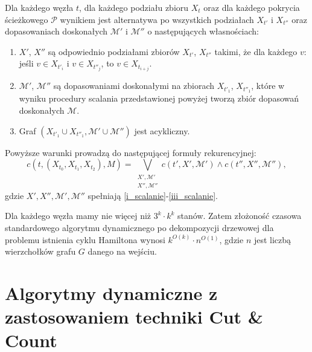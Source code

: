 \documentclass[12pt, oneside]{report}
\newcommand\Omicron{O}
\begin{document}
Dla każdego węzła $t$, dla każdego podziału zbioru $X_t$ oraz dla każdego pokrycia ścieżkowego $\mathcal{P}$ wynikiem jest alternatywa po wszystkich podziałach $X_{t'}$ i $X_{t''}$ oraz dopasowaniach doskonałych $\mathcal{M}'$ i $\mathcal{M}''$ o następujących własnościach:
\begin{enumerate}[label=(\roman*)]
\item \label{i_scalanie}$X'$, $X''$ są odpowiednio podziałami zbiorów $X_{t'}$, $X_{t''}$ takimi, że dla każdego $v$: jeśli $v \in X_{t'_i}$ i $v \in X_{t''_j}$, to $v \in X_{t_{i+j}}$.
\item $\mathcal{M}'$, $\mathcal{M}''$ są dopasowaniami doskonałymi na zbiorach $X_{t'_1}$, $X_{t''_1}$, które w wyniku procedury scalania przedstawionej powyżej 
tworzą zbiór dopasowań doskonałych $\mathcal{M}$.
\item \label{iii_scalanie}Graf $(X_{t'_1} \cup X_{t''_1}, \mathcal{M}' \cup \mathcal{M}'')$ jest acykliczny.
\end{enumerate}
Powyższe warunki prowadzą do następującej formuły rekurencyjnej:
$$c(t, (X_{t_0}, X_{t_1}, X_{t_2}), M) = \bigvee \limits_{\substack{X', \mathcal{M}'\\X'',\mathcal{M}''}} c(t', X', \mathcal{M}') \wedge c(t'', X'', \mathcal{M}''),$$ gdzie $X', X'', \mathcal{M}', \mathcal{M}''$ spełniają \ref{i_scalanie}-\ref{iii_scalanie}.

Dla każdego węzła mamy nie więcej niż $3^k \cdot k^k$ stanów. Zatem złożoność czasowa standardowego algorytmu dynamicznego po dekompozycji drzewowej dla problemu istnienia cyklu Hamiltona wynosi $k^{\Omicron(k)} \cdot n^{\Omicron{(1)}}$, gdzie $n$ jest liczbą wierzchołków grafu $G$ danego na wejściu. 

\newpage
  	\chapter{Algorytmy dynamiczne z zastosowaniem techniki Cut \& Count}
  	\label{cut_n_count}
\end{document}
